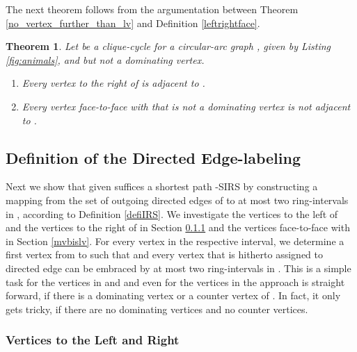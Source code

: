 \documentclass[10pt]{article}
\newtheorem{theorem}{Theorem}[section]
\begin{document}
The next theorem follows from the argumentation between 
Theorem \ref{no_vertex_further_than_lv} and Definition \ref{leftrightface}.

\begin{theorem}\label{Lvrl_v}
Let  be a clique-cycle for a circular-arc graph ,  
given by Listing \ref{fig:animals}, and  but not a dominating vertex.
\begin{enumerate}

\item \label{Lvrl_v1}
Every vertex to the right of  is adjacent to .

\item
Every vertex face-to-face with  that is not a dominating vertex is not 
adjacent to .
\end{enumerate}
\end{theorem}




\subsection{Definition of the Directed Edge-labeling}\label{2-app}



Next we show that  given  suffices a shortest 
path -SIRS by constructing a mapping  from the set of outgoing directed edges of  
to at most two ring-intervals in , according to Definition \ref{defiIRS}.
We investigate the vertices to the left of  and the vertices 
to the right of  in Section \ref{lvbisv} and the vertices face-to-face with  
in Section \ref{mvbislv}.
For every vertex  in the respective interval, we determine a first vertex  from 
 to  such that  and every vertex that is hitherto assigned to directed edge  can 
be embraced by at most two ring-intervals in .
This is a simple task for the vertices in  and  and 
even for the vertices in  the approach is straight forward, if there is a 
dominating vertex or a counter vertex of .
In fact, it only gets tricky, if there are no dominating vertices and no 
counter vertices.






\subsubsection{Vertices to the Left and Right}\label{lvbisv}
\end{document}
